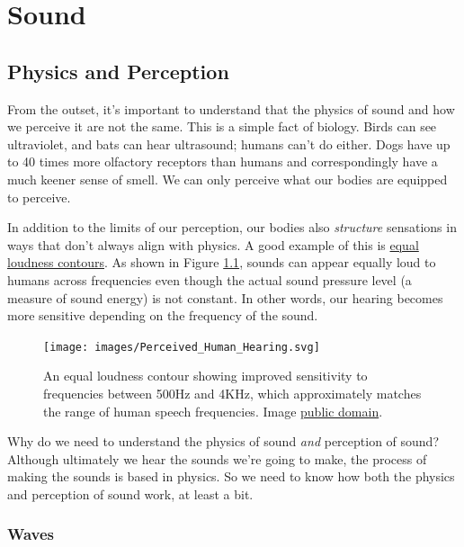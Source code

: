 \documentclass[
]{book}
\begin{document}
\hypertarget{part-sound}{%
\part{Sound}\label{part-sound}}

\hypertarget{physics-and-perception}{%
\chapter{Physics and Perception}\label{physics-and-perception}}

From the outset, it's important to understand that the physics of sound and how we perceive it are not the same.
This is a simple fact of biology.
Birds can see ultraviolet, and bats can hear ultrasound; humans can't do either.
Dogs have up to 40 times more olfactory receptors than humans and correspondingly have a much keener sense of smell.
We can only perceive what our bodies are equipped to perceive.

In addition to the limits of our perception, our bodies also \emph{structure} sensations in ways that don't always align with physics.
A good example of this is \href{https://en.wikipedia.org/wiki/Equal-loudness_contour}{equal loudness contours}.
As shown in Figure \ref{fig:elc}, sounds can appear equally loud to humans across frequencies even though the actual sound pressure level (a measure of sound energy) is not constant.
In other words, our hearing becomes more sensitive depending on the frequency of the sound.



\begin{figure}
\texttt{[image: images/Perceived\_Human\_Hearing.svg]} \caption{An equal loudness contour showing improved sensitivity to frequencies between 500Hz and 4KHz, which approximately matches the range of human speech frequencies. Image \href{https://en.wikipedia.org/wiki/Psychoacoustics\#/media/File:Perceived_Human_Hearing.svg}{public domain}.}\label{fig:elc}
\end{figure}

Why do we need to understand the physics of sound \emph{and} perception of sound?
Although ultimately we hear the sounds we're going to make, the process of making the sounds is based in physics.
So we need to know how both the physics and perception of sound work, at least a bit.

\hypertarget{waves}{%
\section{Waves}\label{waves}}
\end{document}
